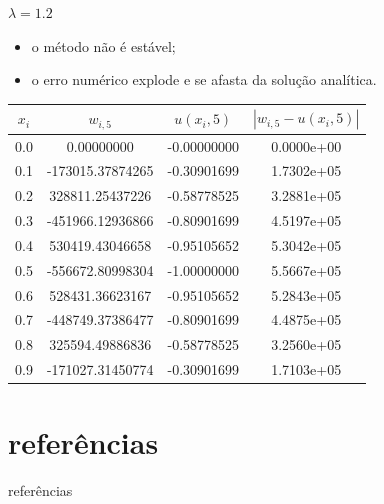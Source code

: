\documentclass{beamer}
\begin{document}
\begin{frame}{\(\lambda = 1.2\)}
    \begin{itemize}
        \item o método não é estável;
        \item o erro numérico explode e se afasta da solução analítica.
    \end{itemize}
    \begin{table}[H]
        \centering
        \label{tab:resultados_lambda_1.2}
        \begin{tabular}{cccc}
            \toprule
            \(x_i\) & \(w_{i, 5}\) & \(u(x_i, 5)\) & \(|w_{i, 5} - u(x_i, 5)|\) \\
            \midrule
            0.0 & 0.00000000 & -0.00000000 & 0.0000e+00 \\
            0.1 & -173015.37874265 & -0.30901699 & 1.7302e+05 \\
            0.2 & 328811.25437226 & -0.58778525 & 3.2881e+05 \\
            0.3 & -451966.12936866 & -0.80901699 & 4.5197e+05 \\
            0.4 & 530419.43046658 & -0.95105652 & 5.3042e+05 \\
            0.5 & -556672.80998304 & -1.00000000 & 5.5667e+05 \\
            0.6 & 528431.36623167 & -0.95105652 & 5.2843e+05 \\
            0.7 & -448749.37386477 & -0.80901699 & 4.4875e+05 \\
            0.8 & 325594.49886836 & -0.58778525 & 3.2560e+05 \\
            0.9 & -171027.31450774 & -0.30901699 & 1.7103e+05 \\
            \bottomrule
        \end{tabular}
    \end{table}
\end{frame}

\section*{referências}

\begin{frame}{referências}
    \printbibliography
\end{frame}
\end{document}
